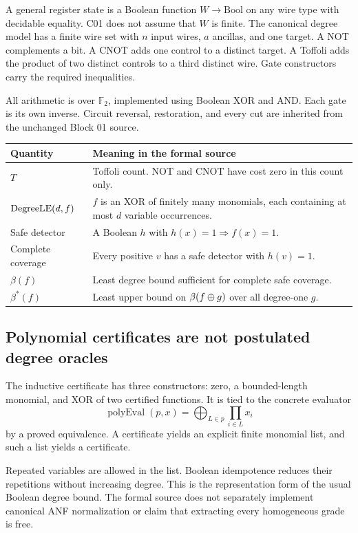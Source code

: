 A general register state is a Boolean function $W\to\mathrm{Bool}$ on any wire type with decidable equality. C01 does not assume that $W$ is finite. The canonical degree model has a finite wire set with $n$ input wires, $a$ ancillas, and one target. A NOT complements a bit. A CNOT adds one control to a distinct target. A Toffoli adds the product of two distinct controls to a third distinct wire. Gate constructors carry the required inequalities.

All arithmetic is over $\mathbb F_2$, implemented using Boolean XOR and AND. Each gate is its own inverse. Circuit reversal, restoration, and every cut are inherited from the unchanged Block 01 source.

\begin{tabularx}{\linewidth}{@{}>{\raggedright\arraybackslash}p{1.25in}>{\raggedright\arraybackslash}X@{}}\toprule
Quantity & Meaning in the formal source\\\midrule
$T$ & Toffoli count. NOT and CNOT have cost zero in this count only.\\
$\operatorname{DegreeLE}(d,f)$ & $f$ is an XOR of finitely many monomials, each containing at most $d$ variable occurrences.\\
Safe detector & A Boolean $h$ with $h(x)=1\Rightarrow f(x)=1$.\\
Complete coverage & Every positive $v$ has a safe detector with $h(v)=1$.\\
$\beta(f)$ & Least degree bound sufficient for complete safe coverage.\\
$\beta^*(f)$ & Least upper bound on $\beta(f\mathbin{\oplus} g)$ over all degree-one $g$.\\\bottomrule
\end{tabularx}

\subsection*{Polynomial certificates are not postulated degree oracles}
The inductive certificate has three constructors: zero, a bounded-length monomial, and XOR of two certified functions. It is tied to the concrete evaluator
\[
\operatorname{polyEval}(p,x)=\bigoplus_{L\in p}\prod_{i\in L}x_i
\]
by a proved equivalence. A certificate yields an explicit finite monomial list, and such a list yields a certificate.

Repeated variables are allowed in the list. Boolean idempotence reduces their repetitions without increasing degree. This is the representation form of the usual Boolean degree bound. The formal source does not separately implement canonical ANF normalization or claim that extracting every homogeneous grade is free.

